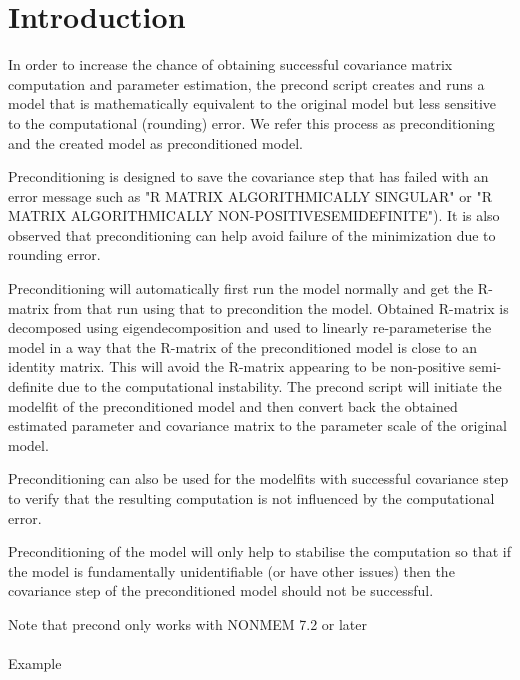 
\usepackage{color}
\usepackage{amsmath}



\maketitle

\section{Introduction}
In order to increase the chance of obtaining successful covariance matrix computation and parameter estimation, the precond script creates and runs a model that is mathematically equivalent to the original model but less sensitive to the computational (rounding) error.  We refer this process as preconditioning and the created model as preconditioned model.

Preconditioning is designed to save the covariance step that has failed with an error message such as "R MATRIX ALGORITHMICALLY SINGULAR" or "R MATRIX ALGORITHMICALLY NON-POSITIVESEMIDEFINITE"). It is also observed that preconditioning can help avoid failure of the minimization due to rounding error.

Preconditioning will automatically first run the model normally and get the R-matrix from that run using that to precondition the model. Obtained R-matrix is decomposed using eigendecomposition and used to linearly re-parameterise the model in a way that the R-matrix of the preconditioned model is close to an identity matrix.  This will avoid the R-matrix appearing to be non-positive semi-definite due to the computational instability.  The precond script will initiate the modelfit of the preconditioned model and then convert back the obtained estimated parameter and covariance matrix to the parameter scale of the original model.

Preconditioning can also be used for the modelfits with successful covariance step to verify that the resulting computation is not influenced by the computational error.

Preconditioning of the model will only help to stabilise the computation so that if the model is fundamentally unidentifiable (or have other issues) then the covariance step of the preconditioned model should not be successful.

Note that precond only works with NONMEM 7.2 or later
\\
\\
Example 

